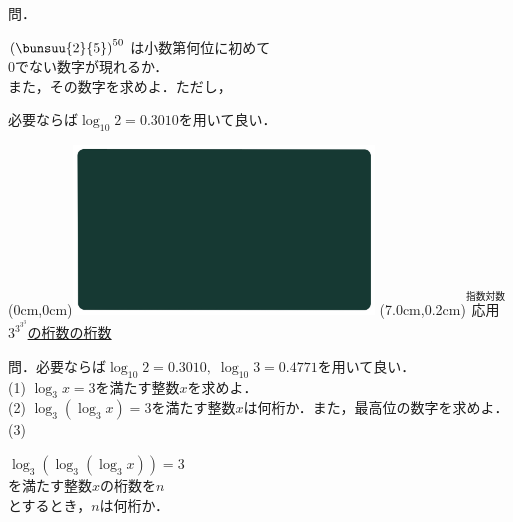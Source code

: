 \documentclass[10pt,
fleqn,
dvipdfmx,
uplatex
]{jsarticle}
\begin{document}
\normalsize
問．

\Large 
\vspace{-1zw}
\hspace{0.5zw}
$\left(\bunsuu{2}{5}\right)^{50}$
\hspace{-1zw}
は小数第何位に初めて\vspace{-0.4zw}\\
\hfill $0$でない数字が現れるか．\\
また，その数字を求めよ．{\normalsize ただし，}

\normalsize
\hfill 必要ならば$\log _{10}2=0.{3010}$を用いて良い．

\newpage

\at(0cm,0cm){\includegraphics[width=8cm,bb=0 0 1920 1080]{./youtube/thumbnails/templates/smart_background/指数対数.jpeg}}
\at(7.0cm,0.2cm){\small\color{bradorange}$\overset{\text{指数対数}}{\text{応用}}$}
{\color{orange}\LARGE\underline{$3^{3^{3^3}}${\Huge の桁数の桁数}}}\vspace{0.1zw}

\tiny
問．必要ならば$\log _{10}2=0.{3010},\;\log _{10}3=0.{4771}$を用いて良い．\vspace{0.2zw}\\
(1)  $\log _3x=3$を満たす整数$x$を求めよ．\vspace{0.2zw}\\
(2)  $\log _3\left(\log _3x\right)=3$を満たす整数$x$は何桁か．また，最高位の数字を求めよ．\vspace{0.2zw}\\
(3)  

\LARGE
\vspace{-0.9zw}
\hspace{0.5zw}
$\log _3\left(\log _3\left(\log _3x\right)\right)=3$\vspace{-0.2zw}\\
を満たす整数$x$の桁数を$n$\vspace{-0.2zw}\\
\hfill とするとき，$n$は何桁か．
\end{document}
